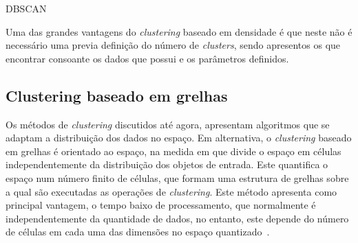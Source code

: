 \begin{algorithm}[ht]
\caption{DBSCAN}\label{dbscan}
\begin{algorithmic}[1]
	\Repeat
					\EndIf
				\EndIf
				\EndIf
			\EndFor
		\EndIf
\EndProcedure 
\end{algorithmic}
\end{algorithm}

Uma das grandes vantagens do \textit{clustering} baseado em densidade é que neste não é necessário uma previa definição do número de \textit{clusters}, sendo apresentos os que encontrar consoante os dados que possui e os parâmetros definidos. 


\subsection{Clustering baseado em grelhas} %

Os métodos de \textit{clustering} discutidos até agora, apresentam algoritmos que se adaptam a distribuição dos dados no espaço. Em alternativa, o \textit{clustering} baseado em grelhas é orientado ao espaço, na medida em que divide o espaço em células independentemente da distribuição dos objetos de entrada. Este quantifica o espaço num número finito de células, que formam uma estrutura de grelhas sobre a qual são executadas as operações de \textit{clustering}. Este método apresenta como principal vantagem, o tempo baixo de processamento, que normalmente é independentemente da quantidade de dados, no entanto, este depende do número de células em cada uma das dimensões no espaço quantizado~\cite{Han2006}.

